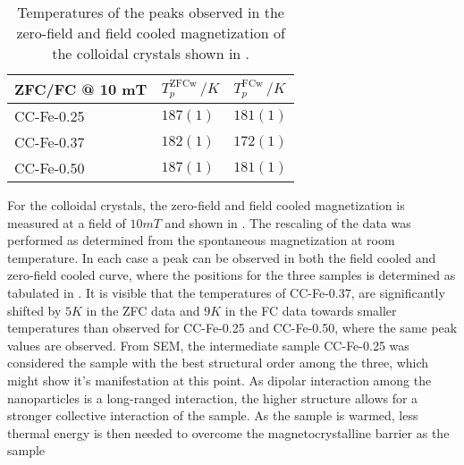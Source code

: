 \documentclass[\main/dresen_thesis.tex]{subfiles}
\begin{document}
    \begin{table}[!htbp]
      \centering
      \caption{\label{tab:colloidalCrystals:ZFCFC:parameters} Temperatures of the peaks observed in the zero-field and field cooled magnetization of the colloidal crystals shown in .}
      \begin{tabular}{ l | l | l}
        \rule{0pt}{2ex} \textbf{ZFC/FC @ 10 mT}
        & $T_p^\mathrm{ZFCw} \, / \unit{K}$
        & $T_p^\mathrm{FCw} \, / \unit{K}$\\
        \hline
        \rule{0pt}{2ex} CC-Fe-0.25    & $187(1)$   & $181(1)$\\
        \rule{0pt}{2ex} CC-Fe-0.37    & $182(1)$   & $172(1)$\\
        \rule{0pt}{2ex} CC-Fe-0.50    & $187(1)$   & $181(1)$\\
        \hline
      \end{tabular}
    \end{table}

    For the colloidal crystals, the zero-field and field cooled magnetization is measured at a field of $10 \unit{mT}$ and shown in .
    The rescaling of the data was performed as determined from the spontaneous magnetization at room temperature.
    In each case a peak can be observed in both the field cooled and zero-field cooled curve, where the positions for the three samples is determined as tabulated in .
    It is visible that the temperatures of CC-Fe-0.37, are significantly shifted by $5 \unit{K}$ in the ZFC data and $9 \unit{K}$ in the FC data towards smaller temperatures than observed for CC-Fe-0.25 and CC-Fe-0.50, where the same peak values are observed.
    From SEM, the intermediate sample CC-Fe-0.25 was considered the sample with the best structural order among the three, which might show it's manifestation at this point.
    As dipolar interaction among the nanoparticles is a long-ranged interaction, the higher structure allows for a stronger collective interaction of the sample.
    As the sample is warmed, less thermal energy is then needed to overcome the magnetocrystalline barrier as the sample

\end{document}
